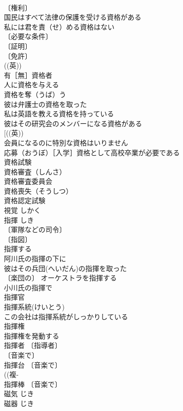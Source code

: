 \documentclass[8pt]{extreport}
\begin{document}
\begin{CJK}{UTF8}{min}
\\	〔権利〕
\\	国民はすべて法律の保護を受ける資格がある 
\\	私には君を責（せ）める資格はない 
\\	〔必要な条件〕
\\	〔証明〕
\\	〔免許〕
\\	((英)) 
\\	有［無］資格者 
\\	人に資格を与える 
\\	資格を奪（うば）う 
\\	彼は弁護士の資格を取った 
\\	私は英語を教える資格を持っている 
\\	彼はその研究会のメンバーになる資格がある 
\\	[((英)) 
\\	会員になるのに特別な資格はいりません 
\\	応募（おうぼ）［入学］資格として高校卒業が必要である 
\\	資格試験 
\\	資格審査（しんさ） 
\\	資格審査委員会 
\\	資格喪失（そうしつ） 
\\	資格認定試験 
\\	視覚	しかく	
\\	指揮	しき	
\\	〔軍隊などの司令〕
\\	〔指図〕
\\	指揮する 
\\	阿川氏の指揮の下に 
\\	彼はその兵団(へいだん)の指揮を取った 
\\	〔楽団の〕 オーケストラを指揮する 
\\	小川氏の指揮で 
\\	指揮官 
\\	指揮系統(けいとう) 
\\	この会社は指揮系統がしっかりしている 
\\	指揮権 
\\	指揮権を発動する 
\\	指揮者 〔指導者〕
\\	〔音楽で〕
\\	指揮台 〔音楽で〕
\\	((複-
\\	指揮棒 〔音楽で〕
\\	磁気	じき	
\\	磁器	じき	

\end{CJK}
\end{document}
